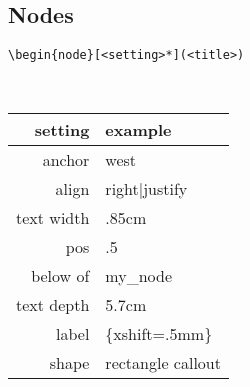 \subsection*{Nodes}
\begin{code}{6.5}
\begin{lstlisting}
\begin{node}[<setting>*](<title>)
\end{lstlisting}
\end{code} \\
\begin{tabularx}{4cm}{r l}
    setting & example \\
    \hline
    anchor & west \\
    align & right|justify \\
    text width & .85cm \\
    pos & .5 \\
    below of & my\_node \\
    text depth & 5.7cm \\
    label & \{xshift=.5mm\} \\
    shape & rectangle callout \\ 
\end{tabularx} \\


